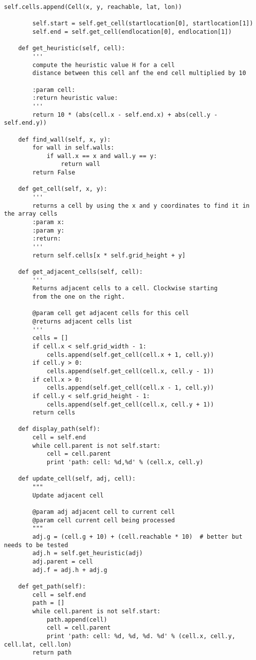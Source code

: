 \begin{lstlisting}[style=custompython, label=astar-code, caption=A-Star algorithm class code]
                self.cells.append(Cell(x, y, reachable, lat, lon))

        self.start = self.get_cell(startlocation[0], startlocation[1])
        self.end = self.get_cell(endlocation[0], endlocation[1])

    def get_heuristic(self, cell):
        '''
        compute the heuristic value H for a cell
        distance between this cell anf the end cell multiplied by 10

        :param cell:
        :return heuristic value:
        '''
        return 10 * (abs(cell.x - self.end.x) + abs(cell.y - self.end.y))

    def find_wall(self, x, y):
        for wall in self.walls:
            if wall.x == x and wall.y == y:
                return wall
        return False

    def get_cell(self, x, y):
        '''
        returns a cell by using the x and y coordinates to find it in the array cells
        :param x:
        :param y:
        :return:
        '''
        return self.cells[x * self.grid_height + y]

    def get_adjacent_cells(self, cell):
        '''
        Returns adjacent cells to a cell. Clockwise starting
        from the one on the right.

        @param cell get adjacent cells for this cell
        @returns adjacent cells list
        '''
        cells = []
        if cell.x < self.grid_width - 1:
            cells.append(self.get_cell(cell.x + 1, cell.y))
        if cell.y > 0:
            cells.append(self.get_cell(cell.x, cell.y - 1))
        if cell.x > 0:
            cells.append(self.get_cell(cell.x - 1, cell.y))
        if cell.y < self.grid_height - 1:
            cells.append(self.get_cell(cell.x, cell.y + 1))
        return cells

    def display_path(self):
        cell = self.end
        while cell.parent is not self.start:
            cell = cell.parent
            print 'path: cell: %d,%d' % (cell.x, cell.y)

    def update_cell(self, adj, cell):
        """
        Update adjacent cell

        @param adj adjacent cell to current cell
        @param cell current cell being processed
        """
        adj.g = (cell.g + 10) + (cell.reachable * 10)  # better but needs to be tested
        adj.h = self.get_heuristic(adj)
        adj.parent = cell
        adj.f = adj.h + adj.g

    def get_path(self):
        cell = self.end
        path = []
        while cell.parent is not self.start:
            path.append(cell)
            cell = cell.parent
            print 'path: cell: %d, %d, %d. %d' % (cell.x, cell.y, cell.lat, cell.lon)
        return path


\end{lstlisting}
